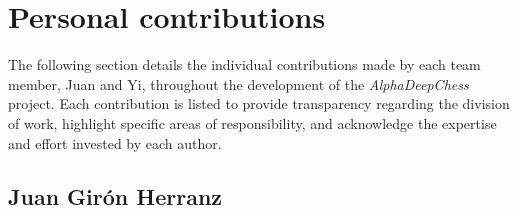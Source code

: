 \chapter{Personal contributions}\label{cap:contribucionesPersonales}

The following section details the individual contributions made by each team member, Juan and Yi, throughout the development of the \textit{AlphaDeepChess} project. Each contribution is listed to provide transparency regarding the division of work, highlight specific areas of responsibility, and acknowledge the expertise and effort invested by each author.

\section*{Juan Girón Herranz}

